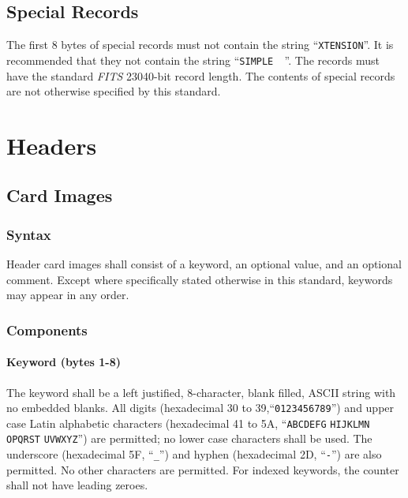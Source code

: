   \section{Special Records}
   The first 8 bytes of special records must
   not contain the string
   ``\verb+XTENSION+''.  It is recommended that they not contain the
   string 
   ``\verb*+SIMPLE  +''.
   The records must have the standard {\em FITS\/} 23040-bit
   record length. The contents of special records are not otherwise
   specified by this standard.
  
  
\chapter{Headers}
  \label{s:head}
  
  \section{Card Images}
  
   \subsection{Syntax}
   Header card images
   shall consist of a keyword, an
   optional value, and an optional comment.  Except
   where specifically stated otherwise
   in this standard, keywords may appear in any order.
  
   \subsection{Components}
  
   \subsubsection{Keyword (bytes 1-8)}
       \label{s:keyw}
The keyword shall be a left justified, 8-character, blank 
filled, ASCII string with no embedded blanks.  All 
digits (hexadecimal 30 to 39,``{\tt 0123456789}'') and 
upper case
Latin alphabetic characters
(hexadecimal 41 to 5A, 
``{\tt ABCDEFG} {\tt HIJKLMN} {\tt OPQRST} {\tt UVWXYZ}'') are 
permitted; no lower case characters shall be used.  The 
underscore
(hexadecimal  5F, ``{\tt \_}'') and 
hyphen
(hexadecimal 2D, ``{\tt -}'') are also permitted.  No other characters
are permitted.  For indexed
keywords, the counter shall not have leading zeroes.

